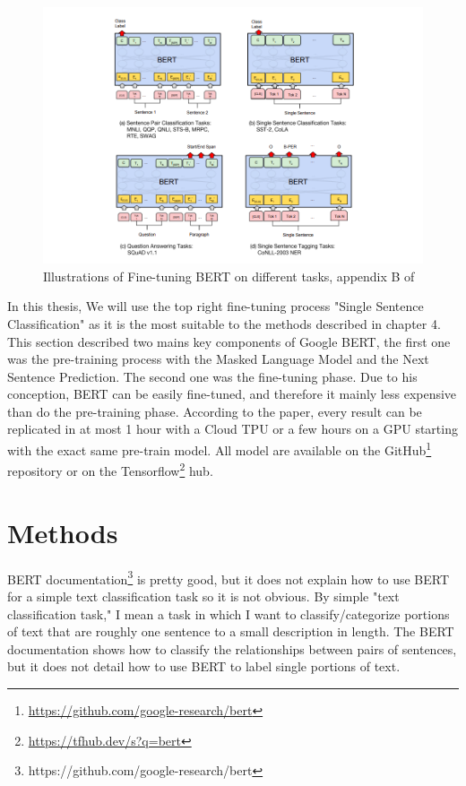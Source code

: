 \begin{figure}[!h]
    \centering
    \includegraphics[width=1\textwidth]{bert-tasks.png}
    \caption{Illustrations of Fine-tuning BERT on different tasks, appendix B of \cite{Devlin2018}}
    \label{fig:Fine-tuning}
\end{figure}

In this thesis, We will use the top right fine-tuning process "Single Sentence Classification" as it is the most suitable to the methods described in chapter 4.\\


This section described two mains key components of Google BERT, the first one was the pre-training process with the Masked Language Model and the Next Sentence Prediction. 
The second one was the fine-tuning phase. Due to his conception, BERT can be easily fine-tuned, and therefore it mainly less expensive than do the pre-training phase. 
According to the paper, every result can be replicated in at most 1 hour with a Cloud TPU or a few hours on a GPU starting with the exact same pre-train model. 
All model are available on the GitHub\footnote{\url{https://github.com/google-research/bert}} repository  or on the Tensorflow\footnote{\url{https://tfhub.dev/s?q=bert}} hub. 


\chapter{Methods}
BERT documentation\footnote{https://github.com/google-research/bert} is pretty good, but it does not explain how to use BERT for a simple text classification task so it is not obvious. By simple "text classification task," I mean a task in which I want to classify/categorize portions of text that are roughly one sentence to a small description in length. The BERT documentation shows how to classify the relationships between pairs of sentences, but it does not detail how to use BERT to label single portions of text. 

